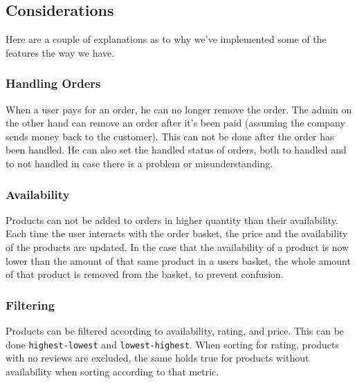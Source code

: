 \subsection{Considerations}

Here are a couple of explanations as to why we've implemented some of the
features the way we have.

\subsubsection{Handling Orders}

When a user pays for an order, he can no longer remove the order. The admin
on the other hand can remove an order after it's been paid (assuming the
company sends money back to the customer). This can not be done after the
order has been handled. He can also set the handled status of orders, both
to handled and to not handled in case there is a problem or misunderstanding.

\subsubsection{Availability}

Products can not be added to orders in higher quantity than their availability.
Each time the user interacts with the order basket, the price and the
availability of the products are updated. In the case that the availability
of a product is now lower than the amount of that same product in a users
basket, the whole amount of that product is removed from the basket, to
prevent confusion.

\subsubsection{Filtering}

Products can be filtered according to availability, rating,
and price. This can be done \texttt{highest-lowest} and
\texttt{lowest-highest}. When sorting for rating, products with no
reviews are excluded, the same holds true for products without availability
when sorting according to that metric.
